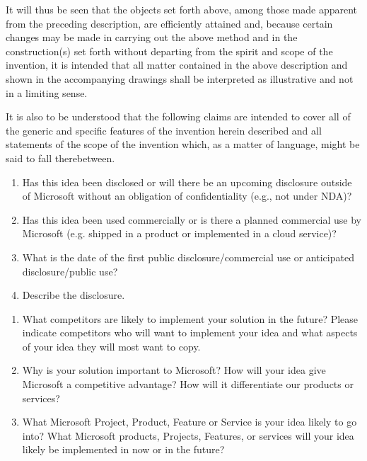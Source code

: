 \documentclass[english]{uspatent}
\begin{document}
\patentParagraph It will thus be seen that the objects set forth above, among those made apparent from the preceding description, are efficiently attained and, because certain changes may be made in carrying out the above method and in the construction(s) set forth without departing from the spirit and scope of the invention, it is intended that all matter contained in the above description and shown in the accompanying drawings shall be interpreted as illustrative and not in a limiting sense.

\patentParagraph It is also to be understood that the following claims are intended to cover all of the generic and specific features of the invention herein described and all statements of the scope of the invention which, as a matter of language, might be said to fall therebetween.



\patentParagraph 
\begin{enumerate}
	\item Has this idea been disclosed or will there be an upcoming disclosure outside of Microsoft without an obligation of confidentiality (e.g., not under NDA)?
	\item Has this idea been used commercially or is there a planned commercial use by Microsoft (e.g. shipped in a product or implemented in a cloud service)?
	\item What is the date of the first public disclosure/commercial use or anticipated disclosure/public use?
	\item Describe the disclosure.

\end{enumerate}


\patentParagraph

\begin{enumerate}
	\item What competitors are likely to implement your solution in the future? Please indicate competitors who will want to implement your idea and what aspects of your idea they will most want to copy.
	\item Why is your solution important to Microsoft? How will your idea give Microsoft a competitive advantage? How will it differentiate our products or services?
	\item What Microsoft Project, Product, Feature or Service is your idea likely to go into? What Microsoft products, Projects, Features, or services will your idea likely be implemented in now or in the future?

\end{enumerate}

\patentDrawingDescriptions
\patentDrawings
\end{document}
